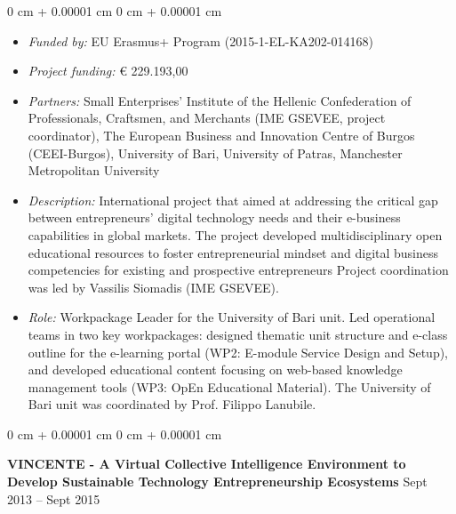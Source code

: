 \documentclass[10pt, a4paper]{article}
\newenvironment{highlights}{
    \begin{itemize}[
        topsep=0.10 cm,
        parsep=0.10 cm,
        partopsep=0pt,
        itemsep=0pt,
        leftmargin=0 cm + 10pt
    ]
}{
    \end{itemize}
} %
\newenvironment{onecolentry}{
    \begin{adjustwidth}{
        0 cm + 0.00001 cm
    }{
        0 cm + 0.00001 cm
    }
}{
    \end{adjustwidth}
} %
\newenvironment{twocolentry}[2][]{
    \onecolentry
    \def\secondColumn{#2}
    \setcolumnwidth{\fill, 4.5 cm}
    \begin{paracol}{2}
}{
    \switchcolumn \raggedleft \secondColumn
    \end{paracol}
    \endonecolentry
} %
\begin{document}
        \vspace{0.10 cm}
        \begin{onecolentry}
            \begin{highlights}
                \item \textit{Funded by:} EU Erasmus+ Program (2015-1-EL-KA202-014168)
                \item \textit{Project funding:} € 229.193,00
                \item \textit{Partners:} Small Enterprises’ Institute of the Hellenic Confederation of Professionals, Craftsmen, and Merchants (IME GSEVEE, project coordinator), The European Business and Innovation Centre of Burgos (CEEI-Burgos), University of Bari, University of Patras, Manchester Metropolitan University
                \item \textit{Description:} International project that aimed at addressing the critical gap between entrepreneurs' digital technology needs and their e-business capabilities in global markets. The project developed multidisciplinary open educational resources to foster entrepreneurial mindset and digital business competencies for existing and prospective entrepreneurs Project coordination was led by Vassilis Siomadis (IME GSEVEE).
                \item \textit{Role:} Workpackage Leader for the University of Bari unit. Led operational teams in two key workpackages: designed thematic unit structure and e-class outline for the e-learning portal (WP2: E-module Service Design and Setup), and developed educational content focusing on web-based knowledge management tools (WP3: OpEn Educational Material). The University of Bari unit was coordinated by Prof. Filippo Lanubile.
            \end{highlights}
        \end{onecolentry}


        \vspace{0.2 cm}

        \begin{twocolentry}{
            Sept 2013 – Sept 2015
        }
            \textbf{VINCENTE - A Virtual Collective Intelligence Environment to Develop Sustainable Technology Entrepreneurship Ecosystems}\end{twocolentry}
\end{document}

